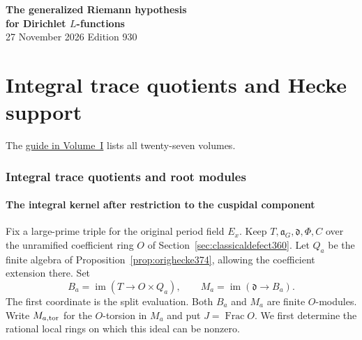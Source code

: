 \documentclass[a4paper,11pt]{article}
\theoremstyle{definition}
\theoremstyle{remark}
\numberwithin{equation}{section}
\begin{document}
\setcounter{part}{7}
\thispagestyle{plain}\begin{center}
{\LARGE\bfseries The generalized Riemann hypothesis\\[2pt]for Dirichlet \(L\)-functions}\\[6pt]
{\small 27 November 2026 \quad\textperiodcentered\quad Edition 930}\end{center}
\part{Integral trace quotients and Hecke support}\label{part:VIII}
\begin{abstract}\noindent We study the part of the trace ring detected by reducible representations. Integral trace quotients and Frobenius determinants give bounds for strict classes. We then descend to auxiliary fields and examine the support of the Hecke module on ordinary curves.\end{abstract}
\setcounter{section}{39}
\noindent The \hyperref[seriesguide]{guide in Volume~I} lists all twenty-seven volumes.
\begingroup\small\setlength{\parskip}{0pt}\tableofcontents\endgroup
\clearpage

\section{Integral trace quotients and root modules}\label{nav:chapter-integral-trace-quotients}\label{nav:volume-VIII}
\subsection{The integral kernel after restriction to the cuspidal component}
\label{sec:integraldefect377}

Fix a large-prime triple for the original period field \(E_x\).
Keep \(T,\mathfrak a_G,\mathfrak d,\Phi,C\) over the unramified
coefficient ring \(O\) of Section~\ref{sec:classicaldefect360}.
Let \(Q_a\) be the finite algebra of
Proposition~\ref{prop:orighecke374}, allowing the coefficient
extension there. Set
\[
 B_a=\operatorname{im}(T\longrightarrow O\times Q_a),
 \qquad M_a=\operatorname{im}(\mathfrak d\longrightarrow B_a).
\]
The first coordinate is the split evaluation.
Both \(B_a\) and \(M_a\) are finite \(O\)-modules. Write
\(M_{a,\rm tor}\) for the \(O\)-torsion in \(M_a\) and put
\(J=\operatorname{Frac}O\). We first determine the rational
local rings on which this ideal can be nonzero.
\end{document}
